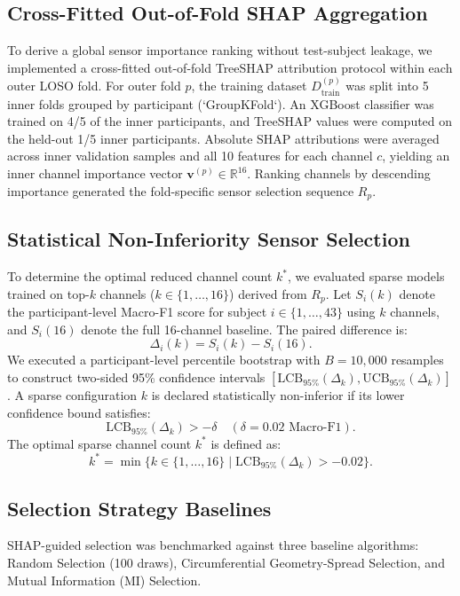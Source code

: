 \documentclass[10pt,twocolumn,letterpaper]{article}
\begin{document}
\subsection{Cross-Fitted Out-of-Fold SHAP Aggregation}
To derive a global sensor importance ranking without test-subject leakage, we implemented a cross-fitted out-of-fold TreeSHAP attribution protocol within each outer LOSO fold. For outer fold $p$, the training dataset $D_{\text{train}}^{(p)}$ was split into 5 inner folds grouped by participant (`GroupKFold`). An XGBoost classifier was trained on 4/5 of the inner participants, and TreeSHAP values were computed on the held-out 1/5 inner participants. Absolute SHAP attributions were averaged across inner validation samples and all 10 features for each channel $c$, yielding an inner channel importance vector $\mathbf{v}^{(p)} \in \mathbb{R}^{16}$. Ranking channels by descending importance generated the fold-specific sensor selection sequence $R_p$.

\subsection{Statistical Non-Inferiority Sensor Selection}
To determine the optimal reduced channel count $k^*$, we evaluated sparse models trained on top-$k$ channels ($k \in \{1, \dots, 16\}$) derived from $R_p$. Let $S_i(k)$ denote the participant-level Macro-F1 score for subject $i \in \{1, \dots, 43\}$ using $k$ channels, and $S_i(16)$ denote the full 16-channel baseline. The paired difference is:
\begin{equation}
    \Delta_i(k) = S_i(k) - S_i(16).
\end{equation}
We executed a participant-level percentile bootstrap with $B = 10,000$ resamples to construct two-sided 95\% confidence intervals $[\text{LCB}_{95\%}(\Delta_k), \text{UCB}_{95\%}(\Delta_k)]$. A sparse configuration $k$ is declared statistically non-inferior if its lower confidence bound satisfies:
\begin{equation}
    \text{LCB}_{95\%}(\Delta_k) > -\delta \quad (\delta = 0.02 \text{ Macro-F1}).
\end{equation}
The optimal sparse channel count $k^*$ is defined as:
\begin{equation}
    k^* = \min \{ k \in \{1, \dots, 16\} \mid \text{LCB}_{95\%}(\Delta_k) > -0.02 \}.
\end{equation}

\subsection{Selection Strategy Baselines}
SHAP-guided selection was benchmarked against three baseline algorithms: Random Selection (100 draws), Circumferential Geometry-Spread Selection, and Mutual Information (MI) Selection.
\end{document}
